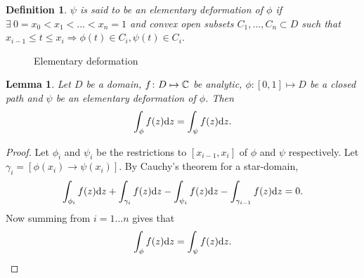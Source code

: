 \documentclass{notes}
\theoremstyle{plain}
\newtheorem{definition}[proposition]{Definition}
\newtheorem{lemma}[proposition]{Lemma}
\begin{document}
\begin{definition}
$\psi$ is said to be an elementary deformation%
 of $\phi$ if
$\exists\ 0 = x_0 < x_1 < \dots < x_n = 1$ and convex open subsets
$C_1, \dots, C_n \subset D$ such that $x_{i-1} \le t \le x_i
\Rightarrow \phi(t) \in C_i, \psi(t) \in C_i$.
\end{definition}

\begin{figure}[h]
\begin{center}
\end{center}
\caption{Elementary deformation}
\end{figure}

\begin{lemma}
  Let $D$ be a domain, $f \colon D \mapsto \mathbb{C}$ be analytic, $\phi
  \colon [0,1] \mapsto D$ be a closed path and $\psi$ be an elementary
  deformation of $\phi$.  Then
\[
\int_\phi f(z) \mathrm{d} z = \int_\psi f(z) \mathrm{d} z.
\]
\end{lemma}

\begin{proof}
Let $\phi_i$ and $\psi_i$ be the restrictions to $[x_{i-1},x_i]$ of $\phi$ and
$\psi$ respectively.  Let $\gamma_i = [\phi(x_i) \rightarrow \psi(x_i)]$.
By Cauchy's theorem for a star-domain,
\[
\int_{\phi_i} f(z) \mathrm{d} z + \int_{\gamma_i} f(z) \mathrm{d} z
- \int_{\psi_i} f(z) \mathrm{d} z - \int_{\gamma_{i-1}} f(z) \mathrm{d} z = 0.
\]
Now summing from $i = 1 \dots n$ gives that
\[
\int_\phi f(z) \mathrm{d} z = \int_\psi f(z) \mathrm{d} z.
\]
\end{proof}
\end{document}
